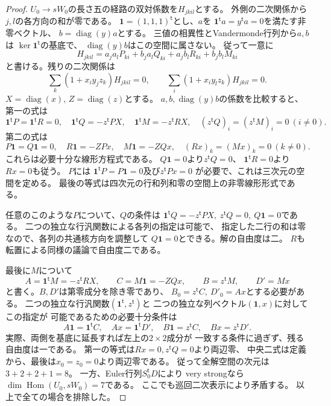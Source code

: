 \begin{proof}
$U_0\to sW_0$の長さ五の経路の双対係数を$H_{jkil}$とする。
外側の二次関係から$j,l$の各方向の和が零である。
$\mathbf1=(1,1,1)^{\mathsf t}$とし、$a$を
$\mathbf1^{\mathsf t}a=y^{\mathsf t}a=0$を満たす非零ベクトル、
$b=\operatorname{diag}(y)a$とする。
三値の相異性とVandermonde行列から$a,b$は
$\ker\mathbf1^{\mathsf t}$の基底で、
$\operatorname{diag}(y)b$はこの空間に属さない。
従って一意に
\[
 H_{jkil}=a_j a_l P_{ki}+b_j a_l Q_{ki}
            +a_j b_l R_{ki}+b_j b_l M_{ki}
\]
と書ける。残りの二次関係は
\[
 \sum_k(1+x_i y_j z_k)H_{jkil}=0,\qquad
 \sum_i(1+x_i y_l z_k)H_{jkil}=0 .
\]
$X=\operatorname{diag}(x),\, Z=\operatorname{diag}(z)$とする。
$a,b,\operatorname{diag}(y)b$の係数を比較すると、
第一の式は
\[
 \mathbf1^{\mathsf t}P=\mathbf1^{\mathsf t}R=0,\quad
 \mathbf1^{\mathsf t}Q=-z^{\mathsf t}PX,\quad
 \mathbf1^{\mathsf t}M=-z^{\mathsf t}RX,
 \quad (z^{\mathsf t}Q)_i=(z^{\mathsf t}M)_i=0\ (i\ne0).
\]
第二の式は
\[
 P\mathbf1=Q\mathbf1=0,\quad
 R\mathbf1=-ZPx,\quad M\mathbf1=-ZQx,\quad
 (Rx)_k=(Mx)_k=0\ (k\ne0).
\]
これらは必要十分な線形方程式である。
$Q\mathbf1=0$より$z^{\mathsf t}Q=0$、
$\mathbf1^{\mathsf t}R=0$より$Rx=0$も従う。
$P$には
$\mathbf1^{\mathsf t}P=P\mathbf1=0$及び$z^{\mathsf t}Px=0$
が必要で、これは三次元の空間を定める。
最後の等式は四次元の行和列和零の空間上の非零線形形式である。

任意のこのような$P$について、$Q$の条件は
$\mathbf1^{\mathsf t}Q=-z^{\mathsf t}PX,\ z^{\mathsf t}Q=0,\
Q\mathbf1=0$である。
二つの独立な行汎関数による各列の指定は可能で、
指定した二行の和は零なので、各列の共通核方向を調整して
$Q\mathbf1=0$とできる。解の自由度は二。
$R$も転置による同様の議論で自由度二である。

最後に$M$について
\[
 A=\mathbf1^{\mathsf t}M=-z^{\mathsf t}RX,\qquad
 C=M\mathbf1=-ZQx,\qquad
 B=z^{\mathsf t}M,\qquad D'=Mx
\]
と書く。$B,D'$は第零成分を除き零であり、
$B_0=z^{\mathsf t}C,\ D'_0=Ax$とする必要がある。
二つの独立な行汎関数$(\mathbf1^{\mathsf t},z^{\mathsf t})$と
二つの独立な列ベクトル$(\mathbf1,x)$に対してこの指定が
可能であるための必要十分条件は
\[
 A\mathbf1=\mathbf1^{\mathsf t}C,\quad Ax=\mathbf1^{\mathsf t}D',
 \quad B\mathbf1=z^{\mathsf t}C,\quad Bx=z^{\mathsf t}D'.
\]
実際、両側を基底に延長すれば左上の$2\times2$成分が
一致する条件に過ぎず、残る自由度は一である。
第一の等式は$Rx=0,z^{\mathsf t}Q=0$より両辺零、
中央二式は定義から、最後は$x_0=z_0=0$より両辺零である。
従って全解空間の次元は$3+2+2+1=8$。
一方、Euler行列$S_0^{\mathsf t}D$により
very strongなら$\dim\operatorname{Hom}(U_0,sW_0)=7$である。
ここでも巡回二次表示により矛盾する。
以上で全ての場合を排除した。
\end{proof}


